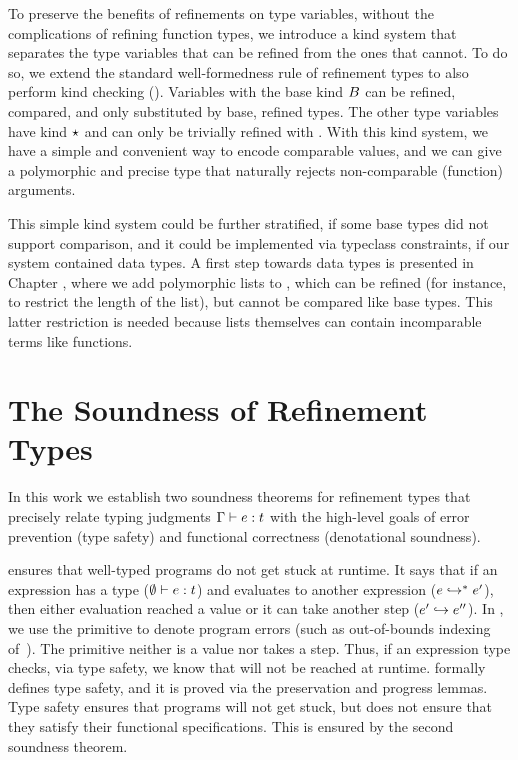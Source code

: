 %
To preserve the benefits of refinements
on type variables, without the complications
of refining function types, we introduce
a kind system that separates the type
variables that can be refined from the
ones that cannot.
%
To do so, we extend the standard well-formedness rule of refinement types
to also perform kind checking (\isWellFormed{\tcenv}{\stype}{\skind}).
%
Variables with the base kind $B$
can be refined, compared, and only
substituted by base, refined types.
%
The other type variables have kind $\star$
and can only be trivially refined with \ttrue.
With this kind system, we have a simple
and convenient way to encode comparable values,
and we can give 
a polymorphic and precise type that
naturally rejects non-comparable
(\eg function) arguments.


This simple kind system could be further stratified,
\ie if some base types did not support comparison,
and it could be implemented via typeclass constraints,
if our system contained data types.
A first step towards data types is presented in Chapter
, where we add polymorphic lists to \sysrf,
which can be refined (for instance, to restrict the length
of the list), but cannot be compared like base types. This 
latter restriction is needed because lists themselves can
contain incomparable terms like functions.


\section{The Soundness of Refinement Types}
\label{sec:overview:soundness}

In this work we establish two soundness theorems for refinement types
that precisely relate typing judgments ${\mathrm{\Gamma}} \vdash {e} : {t}$
with the high-level goals of error prevention (type safety) and
functional correctness (denotational soundness).

 ensures that well-typed programs 
do not get stuck at runtime.
It says that  if an expression has a type (${\emptyset} \vdash {e} : {t}$)
and evaluates to another expression (${e} \hookrightarrow^{*} {e'}$),
then either evaluation reached a value 
or it can take another step (${\sexpr'}\step{\sexpr''}$).
In \sysrf, we use the primitive \eerr to denote program errors 
(such as out-of-bounds indexing of~).
The \eerr primitive neither is a value nor takes a step.
Thus, if an expression type checks, via type safety, 
we know that \eerr will not be reached at runtime.
 formally defines type safety, 
and it is proved via the preservation and progress lemmas.
%
Type safety ensures that programs will not get stuck, but does not ensure that they
satisfy their functional specifications. This is ensured by the second soundness theorem.

